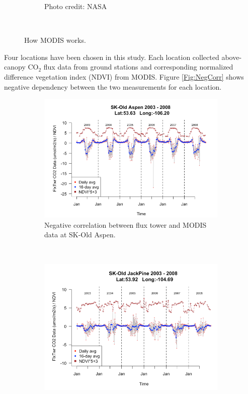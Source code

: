 \documentclass{article}\usepackage[]{graphicx}\usepackage[]{color}
\begin{document}
\begin{figure}[!ht]
\begin{subfigure}[ht]{0.37\textwidth}
        \caption{Photo credit: NASA}
    \end{subfigure}
        ~ %
    \caption{How MODIS works.}\label{Fig:MODIS}
\end{figure}

Four locations have been chosen in this study.
Each location collected above-canopy CO$_2$ flux data from ground stations and corresponding normalized difference vegetation index (NDVI) from MODIS. Figure \ref{Fig:NegCorr} shows negative dependency between the two measurements for each location. 

\begin{figure}[ht]
    \centering
    \begin{subfigure}[ht]{0.45\textwidth}
        \includegraphics[width=\textwidth]{OAP_plot_together.png}
        \caption{Negative correlation between flux tower and MODIS data at SK-Old Aspen.}
        \label{Fig:NegCorr_OAP}
    \end{subfigure}
    ~ %
    \begin{subfigure}[ht]{0.45\textwidth}
        \includegraphics[width=\textwidth]{OJP_plot_together.png}

\end{subfigure}
\end{figure}
\end{document}
